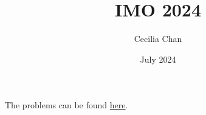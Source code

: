 \documentclass{article}
\title{IMO 2024}
\author{Cecilia Chan}
\date{July 2024}
\begin{document}
\maketitle

The problems can be found \href{https://www.imo-official.org/problems.aspx}{here}.


 
\end{document}
